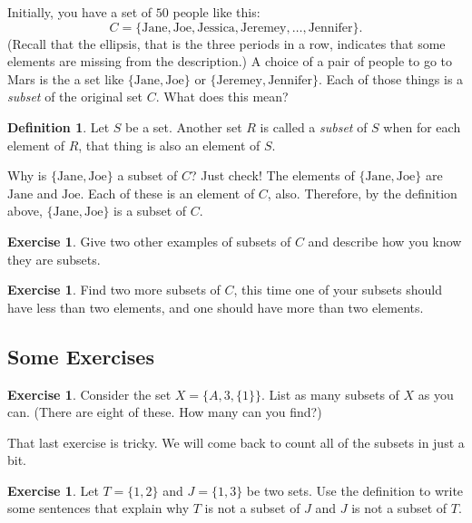 \documentclass[12pt,letterpaper]{article}
\theoremstyle{definition}
\newtheorem{exercise}[question]{Exercise}
\newtheorem*{definition}{Definition}
\begin{document}
Initially, you have a set of $50$ people like this:
\[
C = \{ \text{Jane}, \text{Joe}, \text{Jessica}, \text{Jeremey}, \ldots, \text{Jennifer} \}.
\]
(Recall that the ellipsis, that is the three periods in a row, indicates that some elements are missing from the description.)
A choice of a pair of people to go to Mars is the a set like $\{ \text{Jane}, \text{Joe} \}$ or $\{\text{Jeremey}, \text{Jennifer} \}$. 
Each of those things is a \emph{subset} of the original set $C$.
What does this mean?

\begin{definition} Let $S$ be a set. Another set $R$ is called a \emph{subset} of $S$ when for each element of $R$, that thing is also an element of $S$.
\end{definition}

Why is $\{ \text{Jane}, \text{Joe}\}$ a subset of $C$?
Just check!
The elements of $\{ \text{Jane}, \text{Joe} \}$ are $\text{Jane}$ and $\text{Joe}$. Each of these is an element of $C$, also. Therefore, by the definition above, $\{ \text{Jane}, \text{Joe}\}$ is a subset of $C$.

\begin{exercise}
Give two other examples of subsets of $C$ and describe how you know they are subsets.
\end{exercise}

\begin{exercise}
Find two more subsets of $C$, this time one of your subsets should have less than two elements, and one should have more than two elements.
\end{exercise}

\subsection*{Some Exercises}

\begin{exercise}
Consider the set $X = \{A, 3, \{1\} \}$.
List as many subsets of $X$ as you can.
(There are eight of these. How many can you find?)
\end{exercise}

That last exercise is tricky.
We will come back to count all of the subsets in just a bit.

\begin{exercise}
Let $T = \{1, 2\}$ and $J = \{1, 3\}$ be two sets.
Use the definition to write some sentences that explain why $T$ is not a subset of $J$ and $J$ is not a subset of $T$.
\end{exercise}
\end{document}
